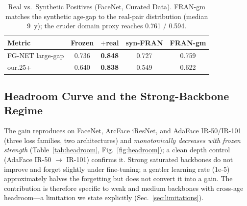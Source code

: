 \documentclass[journal]{IEEEtran}
\begin{document}
\begin{table}[!t]
\renewcommand{\arraystretch}{1.15}
\caption{Real vs.\ Synthetic Positives (FaceNet, Curated Data). FRAN-gm matches the synthetic age-gap to the real-pair distribution (median 9~y); the cruder domain proxy reaches 0.761 / 0.594.}
\label{tab:synth}
\centering
\footnotesize
\begin{tabular}{@{}lcccc@{}}
\toprule
Metric & Frozen & $+$real & syn-FRAN & FRAN-gm \\
\midrule
FG-NET large-gap & 0.736 & \textbf{0.848} & 0.727 & 0.759 \\
our.25+ & 0.640 & \textbf{0.838} & 0.549 & 0.622 \\
\bottomrule
\end{tabular}
\end{table}

\subsection{Headroom Curve and the Strong-Backbone Regime}\label{sec:res-headroom}
The gain reproduces on FaceNet, ArcFace iResNet, and AdaFace IR-50/IR-101 (three loss families, two architectures) and \emph{monotonically decreases with frozen strength} (Table~\ref{tab:headroom}, Fig.~\ref{fig:headroom}); a clean depth control (AdaFace IR-50 $\rightarrow$ IR-101) confirms it. Strong saturated backbones do not improve and forget slightly under fine-tuning; a gentler learning rate (1e-5) approximately halves the forgetting but does not convert it into a gain. The contribution is therefore specific to weak and medium backbones with cross-age headroom---a limitation we state explicitly (Sec.~\ref{sec:limitations}).
\end{document}
